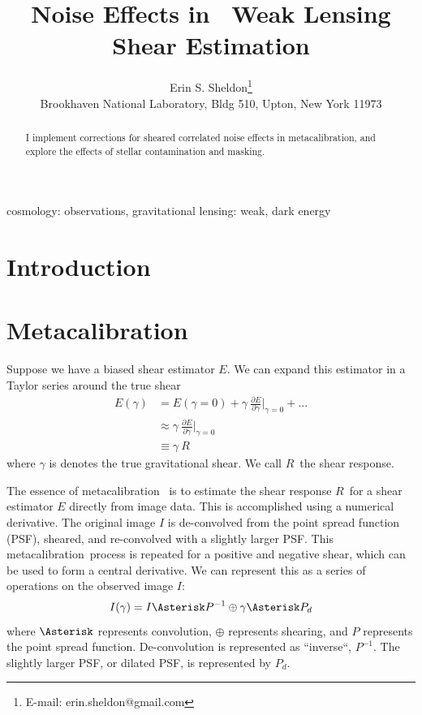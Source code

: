 \documentclass[usegraphicx,usenatbib]{mn2e}
\title{Noise Effects in \Mcal\ Weak Lensing Shear Estimation}
\author[Erin S. Sheldon]{Erin S. Sheldon\thanks{E-mail: erin.sheldon@gmail.com}\\
Brookhaven National Laboratory, Bldg 510, Upton, New York 11973}
\newcommand{\mcal}{metacalibration}
\newcommand{\mcalR}{$R$}
\begin{document}
\maketitle

\begin{abstract}

I implement corrections for sheared correlated noise effects in \mcal, and
explore the effects of stellar contamination and masking.   

\end{abstract}


\begin{keywords}                                                                    
    cosmology: observations,
    gravitational lensing: weak,
    dark energy
\end{keywords} 

\section{Introduction} \label{sec:intro}

\section{Metacalibration} \label{sec:algo}

Suppose we have a biased shear estimator $E$.  We can expand this estimator
in a Taylor series around the true shear
\begin{align}
    E(\gamma) &= E(\gamma=0) + \gamma ~ \frac{ \partial E }{ \partial \gamma }\bigg|_{\gamma=0}  + ... \nonumber \\
      & \approx  \gamma ~ \frac{ \partial E }{ \partial \gamma } \bigg|_{\gamma=0}  \\
      & \equiv  \gamma ~ \mbox{\mcalR} \nonumber
\end{align}
where $\gamma$ is denotes the true gravitational shear.  We call \mcalR\
the shear response.

The essence of \mcal\ \citep{HuffMcal} is to estimate the shear response
\mcalR\ for a shear estimator $E$ directly from image data.  This is
accomplished using a numerical derivative.  The original image $I$ is
de-convolved from the point spread function (PSF), sheared, and re-convolved
with a slightly larger PSF.  This \mcal\ process is repeated for a
positive and negative shear, which can be used to form a central derivative.
We can represent this as a series of operations on the observed image $I$:
\begin{equation}
    I(\gamma) = I \Asterisk P^{-1} \oplus \gamma \Asterisk P_{d}
\end{equation}
where $\Asterisk$ represents convolution, $\oplus$ represents shearing,
and $P$ represents the point spread function.  De-convolution
is represented as ``inverse``, $P^{-1}$.  The slightly larger PSF, or
dilated PSF, is represented by $P_{d}$.
\end{document}
